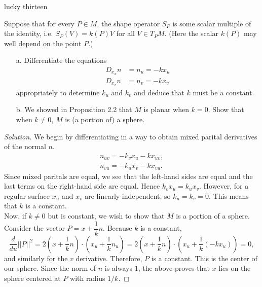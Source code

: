 \documentclass[Shifrin_Solutions_Spring_2015]{subfiles}
\begin{document}
\begin{exercise}
lucky thirteen
\end{exercise}

\begin{exercise}
Suppose that for every $P \in M$, the shape operator $S_P$ is some scalar multiple of the identity, i.e. $S_P(V) = k(P)V$ for all $V \in T_PM$. (Here the scalar $k(P)$ may well depend on the point $P$.)
\begin{itemize}
\item[a.] Differentiate the equations
\begin{align*}
D_{x_u} n & = n_u  = -k x_u \\
D_{x_v} n & = n_v  = -k x_v
\end{align*}
appropriately to determine $k_u$ and $k_v$ and deduce that $k$ must be a constant.

\item[b.] We showed in Proposition 2.2 that $M$ is planar when $k=0$. Show that when $k\neq 0$, $M$ is (a portion of) a sphere.
\end{itemize}
\end{exercise}

\begin{proof}[Solution]
We begin by differentiating in a way to obtain mixed parital derivatives of the normal $n$.
\begin{align*}
n_{uv} = -k_v x_u - k x_{uv}, \\
n_{vu} = -k_u x_v - k x_{vu} .
\end{align*}
Since mixed paritals are equal, we see that the left-hand sides are equal and the last terms on the right-hand side are equal. Hence $k_v x_u = k_u x_v$. However, for a regular surface $x_u$ and $x_v$ are linearly independent, so $k_u=k_v=0$. This means that $k$ is a constant.\\

Now, if $k\neq 0$ but is constant, we wish to show that $M$ is a portion of a sphere. Consider the vector $P = x + \dfrac{1}{k} n$.  Because $k$ is a constant,
\[
\dfrac{d}{du} ||P||^2 =2 \left( x + \dfrac{1}{k}n\right) \cdot \left( x_u + \dfrac{1}{k} n_u\right) = 2\left( x + \dfrac{1}{k}n\right) \cdot \left( x_u + \dfrac{1}{k}(-k x_u)\right) = 0,
\]
and similarly for the $v$ derivative. Therefore, $P$ is a constant. This is the center of our sphere. Since the norm of $n$ is always $1$, the above proves that $x$ lies on the sphere centered at $P$ with radius $1/k$.
\end{proof}
\end{document}
